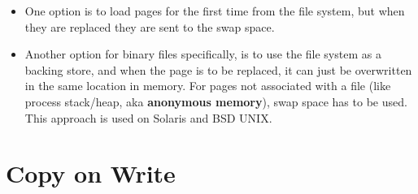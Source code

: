 \documentclass{article}
\theoremstyle{plain}
\theoremstyle{definition}
\begin{document}
\begin{itemize}
    \item One option is to load pages for the first time from the file system, but when they are replaced they are sent to the swap space. 
    
    \item Another option for binary files specifically, is to use the file system as a backing store, and when the page is to be replaced, it can just be overwritten in the same location in memory. For pages not associated with a file (like process stack/heap, aka \textbf{anonymous memory}), swap space has to be used. This approach is used on Solaris and BSD UNIX.
\end{itemize}

\section{Copy on Write}
\end{document}
